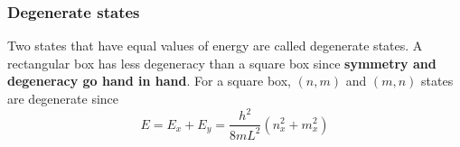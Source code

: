 \documentclass[12pt]{article}
\begin{document}
\subsubsection*{Degenerate states}
Two states that have equal values of energy are called degenerate states. A rectangular box has less degeneracy than a square box since \textbf{symmetry and degeneracy go hand in hand}. For a square box, $(n,m)$ and $(m,n)$ states are degenerate since 
\[E=E_x + E_y=\frac{h^2}{8mL^2}(n_x^2+m_x^2)\]
\end{document}

